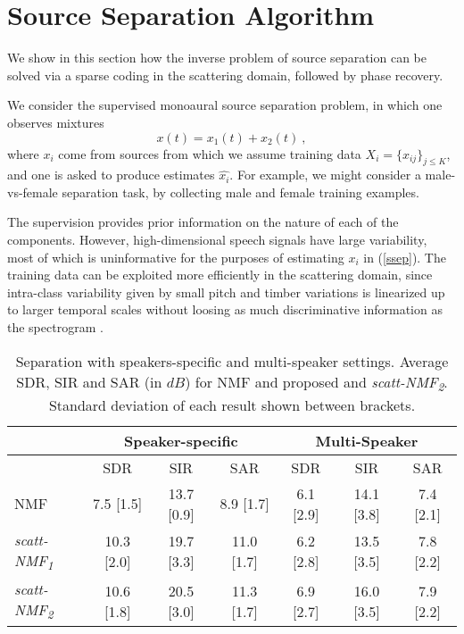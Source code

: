 \section{Source Separation Algorithm}
\label{algosec}
We show in this section how the inverse problem of source separation 
can be solved via a sparse coding in the scattering domain, followed by phase recovery.

We consider the supervised 
monoaural source separation problem, in which one observes mixtures 
\begin{equation}
\label{ssep}
x(t) = x_1(t) + x_2(t)~,
\end{equation}
where $x_i$ come from sources from which we assume training data $X_i=\{x_{ij}\}_{j \leq K}$, 
and one is asked to produce estimates $\widehat{x_i}$. 
For example, we might consider a male-vs-female separation task, by 
collecting male and female training examples. 

The supervision provides  prior information on the nature of each of the 
components. However, high-dimensional speech signals have large variability, 
most of which is uninformative for the purposes of estimating $x_i$ in (\ref{ssep}).
The training data can be exploited more efficiently in the scattering domain, since 
intra-class variability given by small pitch and timber variations is linearized up to 
larger temporal scales without loosing as much discriminative information as 
the spectrogram \cite{deepscatt,pami}.

\begin{table*}[t]
\centering
\begin{tabular}{l|c|c|c || c |c |c }
  \hline\hline
  & \multicolumn{3}{c||}{Speaker-specific} & \multicolumn{3}{c}{Multi-Speaker} \\
  \hline
 & SDR & SIR & SAR & SDR & SIR & SAR\\
\hline
NMF  &7.5 [1.5] & 13.7 [0.9] &   8.9 [1.7] & 6.1 [2.9] &   14.1 [3.8] & 7.4 [2.1] \\
\hline
\emph{scatt-NMF\textsubscript{1}} & 10.3 [2.0]  & 19.7 [3.3]  & 11.0 [1.7] &  6.2 [2.8] &   13.5 [3.5] & 7.8 [2.2] \\
\emph{scatt-NMF\textsubscript{2}} &  10.6 [1.8] & 20.5 [3.0]  & 11.3 [1.7]  &  6.9 [2.7] & 16.0 [3.5]  & 7.9 [2.2] \\
  \hline
\end{tabular}
\caption{Separation with speakers-specific and multi-speaker settings. Average SDR, SIR and SAR (in $dB$) for NMF and proposed  and \emph{scatt-NMF\textsubscript{2}}. Standard deviation of each result shown between brackets. \label{ta:eval}}
\vspace{-2ex}
\end{table*}


